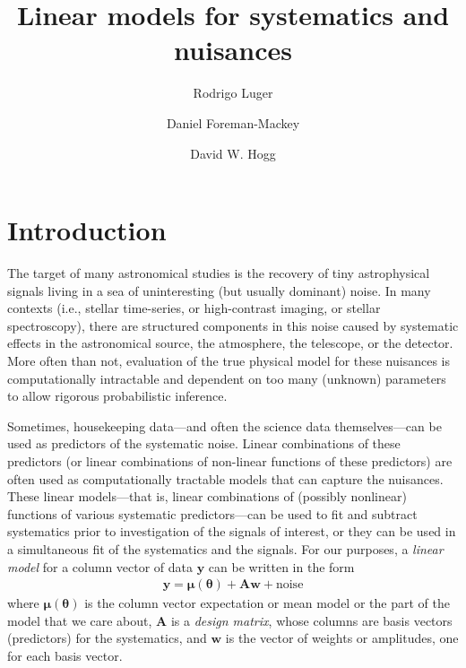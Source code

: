 \documentclass[modern]{rnaastex}
\newcommand{\eqlabel}[1]{\label{eq:#1}}
\newcommand{\bvec}[1]{{\ensuremath{\boldsymbol{#1}}}}
\newcommand{\mA}{\ensuremath{\bvec{A}}}
\newcommand{\vw}{\ensuremath{\bvec{w}}}
\newcommand{\vy}{\ensuremath{\bvec{y}}}
\newcommand{\vm}{\ensuremath{\bvec{\mu}(\bvec{\theta})}}
\begin{document}
\raggedbottom\sloppy\sloppypar\frenchspacing

\title{%
    Linear models for systematics and nuisances
}

\author[0000-0002-0296-3826]{Rodrigo Luger}

\author[0000-0002-9328-5652]{Daniel Foreman-Mackey}

\author[0000-0003-2866-9403]{David W. Hogg}


\section{Introduction}

The target of many astronomical studies is the recovery of tiny astrophysical
signals living in a sea of uninteresting (but usually dominant) noise.
In many contexts (i.e., stellar time-series, or
high-contrast imaging, or stellar spectroscopy), there are structured
components in this noise caused by systematic
effects in the astronomical source, the atmosphere, the telescope, or
the detector.
More often than not, evaluation of the true physical model for these nuisances
is computationally intractable and dependent on too many (unknown) parameters
to allow rigorous probabilistic inference.

Sometimes, housekeeping data---and often the science data themselves---can
be used as predictors of the systematic noise.
Linear combinations of these predictors (or linear combinations of non-linear functions
of these predictors) are often used as
computationally tractable models that can capture the nuisances.
These linear models---that is, linear combinations of (possibly nonlinear) functions
of various systematic predictors---can be used to fit and subtract systematics prior to
investigation of the signals of interest, or they can be used in a
simultaneous fit of the systematics and the signals.
For our purposes, a \emph{linear model} for a column vector of data $\vy$
can be written in the form
\begin{align}
\eqlabel{linearmodel}
\bvec{y} = \vm + \mA \vw + \mathrm{noise}
\end{align}
where $\vm$ is the column vector expectation or mean model or the part of the model
that we care about, $\mA$ is a \emph{design matrix}, whose columns are basis
vectors (predictors) for the systematics,
and $\vw$ is the vector of weights or amplitudes, one
for each basis vector.
\newpage
\end{document}
